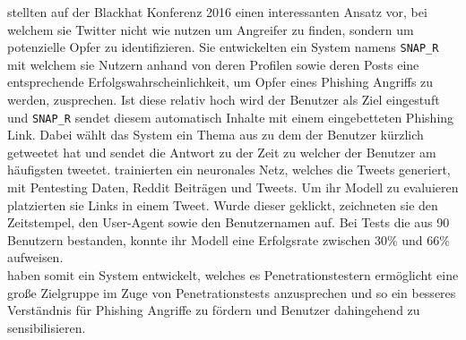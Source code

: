 \documentclass[
    12pt, %
    DIV10,
    ngerman, %
    a4paper, %
    oneside, %
    titlepage, %
    parskip=half, %
    headings=normal, %
    listof=totoc, %
    bibliography=totoc, %
    index=totoc, %
    captions=tableheading, %
    final %
]{scrreprt}
\begin{document}
\textcite{Seymour} stellten auf der Blackhat Konferenz 2016 einen interessanten Ansatz vor, bei welchem sie Twitter nicht wie \textcite{Javed2019} nutzen um Angreifer zu finden, sondern um potenzielle Opfer zu identifizieren. Sie entwickelten ein System namens \texttt{SNAP\_R} mit welchem sie Nutzern anhand von deren Profilen sowie deren Posts eine entsprechende Erfolgswahrscheinlichkeit, um Opfer eines Phishing Angriffs zu werden, zusprechen. Ist diese relativ hoch wird der Benutzer als Ziel eingestuft und \texttt{SNAP\_R} sendet diesem automatisch Inhalte mit einem eingebetteten Phishing Link. Dabei wählt das System ein Thema aus zu dem der Benutzer kürzlich getweetet hat und sendet die Antwort zu der Zeit zu welcher der Benutzer am häufigsten tweetet. \citeauthor{Seymour} trainierten ein neuronales Netz, welches die Tweets generiert, mit Pentesting Daten, Reddit Beiträgen und Tweets. Um ihr Modell zu evaluieren platzierten sie Links in einem Tweet. Wurde dieser geklickt, zeichneten sie den Zeitstempel, den User-Agent sowie den Benutzernamen auf. Bei Tests die aus 90 Benutzern bestanden, konnte ihr Modell eine Erfolgsrate zwischen 30\% und 66\% aufweisen.\\
\citeauthor{Seymour} haben somit ein System entwickelt, welches es Penetrationstestern ermöglicht eine gro{\ss}e Zielgruppe im Zuge von Penetrationstests anzusprechen und so ein besseres Verständnis für Phishing Angriffe zu fördern und Benutzer dahingehend zu sensibilisieren.
\end{document}
